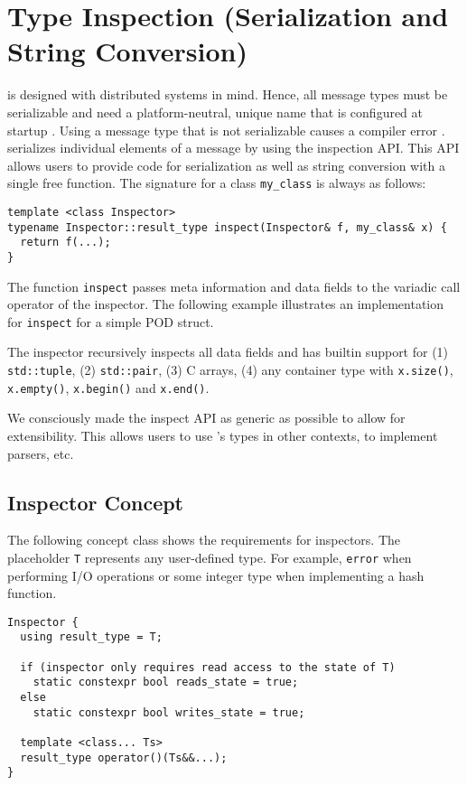 \section{Type Inspection (Serialization and String Conversion)}
\label{type-inspection}

\lib is designed with distributed systems in mind. Hence, all message types must be serializable and need a platform-neutral, unique name that is configured at startup . Using a message type that is not serializable causes a compiler error . \lib serializes individual elements of a message by using the inspection API. This API allows users to provide code for serialization as well as string conversion with a single free function. The signature for a class \lstinline^my_class^ is always as follows:

\begin{lstlisting}
template <class Inspector>
typename Inspector::result_type inspect(Inspector& f, my_class& x) {
  return f(...);
}
\end{lstlisting}

The function \lstinline^inspect^ passes meta information and data fields to the variadic call operator of the inspector. The following example illustrates an implementation for \lstinline^inspect^ for a simple POD struct.



The inspector recursively inspects all data fields and has builtin support for (1) \lstinline^std::tuple^, (2) \lstinline^std::pair^, (3) C arrays, (4) any container type with \lstinline^x.size()^, \lstinline^x.empty()^, \lstinline^x.begin()^ and \lstinline^x.end()^.

We consciously made the inspect API as generic as possible to allow for extensibility. This allows users to use \lib's types in other contexts, to implement parsers, etc.

\subsection{Inspector Concept}

The following concept class shows the requirements for inspectors. The placeholder \lstinline^T^ represents any user-defined type. For example, \lstinline^error^ when performing I/O operations or some integer type when implementing a hash function.

\begin{lstlisting}
Inspector {
  using result_type = T;
  
  if (inspector only requires read access to the state of T)
    static constexpr bool reads_state = true;
  else
    static constexpr bool writes_state = true;
  
  template <class... Ts>
  result_type operator()(Ts&&...);
}
\end{lstlisting}

